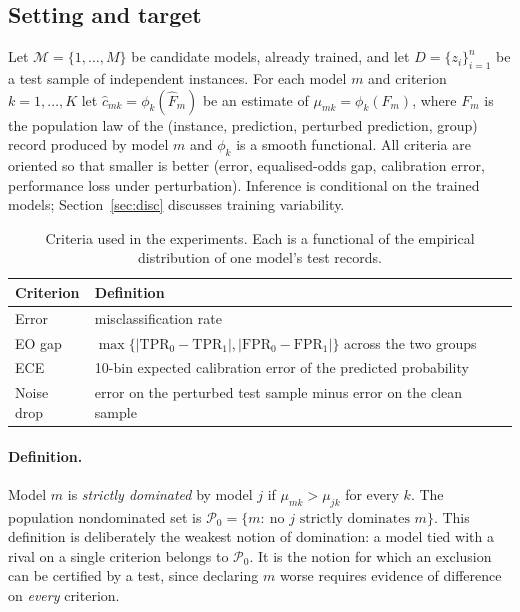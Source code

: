 \documentclass[11pt,a4paper]{article}
\begin{document}
\subsection{Setting and target}
Let $\mathcal{M}=\{1,\dots,M\}$ be candidate models, already trained, and let $D=\{z_i\}_{i=1}^n$ be a test sample of independent instances. For each model $m$ and criterion $k=1,\dots,K$ let $\hat c_{mk}=\phi_k(\hat F_m)$ be an estimate of $\mu_{mk}=\phi_k(F_m)$, where $F_m$ is the population law of the (instance, prediction, perturbed prediction, group) record produced by model $m$ and $\phi_k$ is a smooth functional. All criteria are oriented so that smaller is better (error, equalised-odds gap, calibration error, performance loss under perturbation). Inference is conditional on the trained models; Section~\ref{sec:disc} discusses training variability.

\begin{table}[h]\centering
\caption{Criteria used in the experiments. Each is a functional of the empirical distribution of one model's test records.}
\begin{tabular}{ll}\toprule
Criterion & Definition\\\midrule
Error & misclassification rate\\
EO gap & $\max\{|\mathrm{TPR}_0-\mathrm{TPR}_1|,|\mathrm{FPR}_0-\mathrm{FPR}_1|\}$ across the two groups \citep{hardt2016}\\
ECE & 10-bin expected calibration error of the predicted probability \citep{guo2017}\\
Noise drop & error on the perturbed test sample minus error on the clean sample\\\bottomrule
\end{tabular}
\end{table}

\paragraph{Definition.} Model $m$ is \emph{strictly dominated} by model $j$ if $\mu_{mk}>\mu_{jk}$ for every $k$. The population nondominated set is $\mathcal{P}_0=\{m:\ \text{no } j \text{ strictly dominates } m\}$. This definition is deliberately the weakest notion of domination: a model tied with a rival on a single criterion belongs to $\mathcal{P}_0$. It is the notion for which an exclusion can be certified by a test, since declaring $m$ worse requires evidence of difference on \emph{every} criterion.
\end{document}
